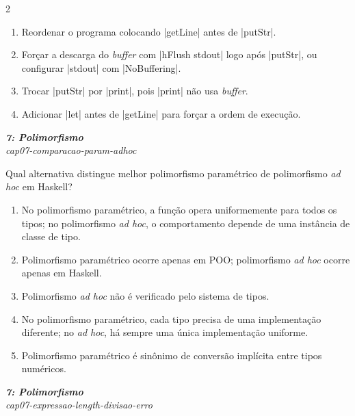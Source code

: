 \documentclass[a4paper,10pt,brazil]{article}
\begin{document}
\begin{multicols}{2}
\begin{enumerate}
  \item Reordenar o programa colocando \haskellinline|getLine| antes de \haskellinline|putStr|.

  \item Forçar a descarga do \emph{buffer} com \haskellinline|hFlush stdout| logo após \haskellinline|putStr|, ou configurar \haskellinline|stdout| com \haskellinline|NoBuffering|.

  \item Trocar \haskellinline|putStr| por \haskellinline|print|, pois \haskellinline|print| não usa \emph{buffer}.

  \item Adicionar \haskellinline|let| antes de \haskellinline|getLine| para forçar a ordem de execução.


\end{enumerate}

\begin{flushright}
  \footnotesize
  \textit{\textbf{7: Polimorfismo}}\\
  \textit{cap07-comparacao-param-adhoc}\\

\end{flushright}
Qual alternativa distingue melhor polimorfismo paramétrico de polimorfismo \emph{ad hoc} em Haskell?
\begin{enumerate}
  \item No polimorfismo paramétrico, a função opera uniformemente para todos os tipos; no polimorfismo \emph{ad hoc}, o comportamento depende de uma instância de classe de tipo.
  \item Polimorfismo paramétrico ocorre apenas em POO; polimorfismo \emph{ad hoc} ocorre apenas em Haskell.
  \item Polimorfismo \emph{ad hoc} não é verificado pelo sistema de tipos.
  \item No polimorfismo paramétrico, cada tipo precisa de uma implementação diferente; no \emph{ad hoc}, há sempre uma única implementação uniforme.
  \item Polimorfismo paramétrico é sinônimo de conversão implícita entre tipos numéricos.

\end{enumerate}

\begin{flushright}
  \footnotesize
  \textit{\textbf{7: Polimorfismo}}\\
  \textit{cap07-expressao-length-divisao-erro}\\


\end{flushright}
\end{multicols}
\end{document}
